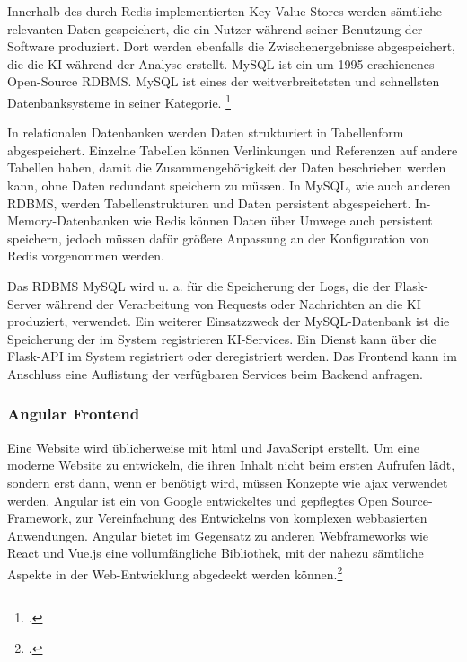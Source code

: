Innerhalb des durch Redis implementierten Key-Value-Stores werden sämtliche relevanten Daten gespeichert, die ein Nutzer während seiner Benutzung der Software produziert. Dort werden ebenfalls die Zwischenergebnisse abgespeichert, die die KI während der Analyse erstellt.
%
MySQL ist ein um 1995 erschienenes Open-Source RDBMS. MySQL ist eines der weitverbreitetsten und schnellsten Datenbanksysteme in seiner Kategorie. \footcite{dubois2008mysql}

In relationalen Datenbanken werden Daten strukturiert in Tabellenform abgespeichert. Einzelne Tabellen können Verlinkungen und Referenzen auf andere Tabellen haben, damit die Zusammengehörigkeit der Daten beschrieben werden kann, ohne Daten redundant speichern zu müssen. In MySQL, wie auch anderen RDBMS, werden Tabellenstrukturen und Daten persistent abgespeichert. In-Memory-Datenbanken wie Redis können Daten über Umwege auch persistent speichern, jedoch müssen dafür größere Anpassung an der Konfiguration von Redis vorgenommen werden.

Das RDBMS MySQL wird u. a. für die Speicherung der Logs, die der Flask-Server während der Verarbeitung von Requests oder Nachrichten an die KI produziert, verwendet. Ein weiterer Einsatzzweck der MySQL-Datenbank ist die Speicherung der im System registrieren KI-Services. Ein Dienst kann über die Flask-API im System registriert oder deregistriert werden. Das Frontend kann im Anschluss eine Auflistung der verfügbaren Services beim Backend anfragen.

\subsubsection{Angular Frontend}
Eine Website wird üblicherweise mit \ac{html} und JavaScript erstellt. Um eine moderne Website zu entwickeln, die ihren Inhalt nicht beim ersten Aufrufen lädt, sondern erst dann, wenn er benötigt wird, müssen Konzepte wie \ac{ajax} verwendet werden. Angular ist ein von Google entwickeltes und gepflegtes Open Source-Framework, zur Vereinfachung des Entwickelns von komplexen webbasierten Anwendungen. Angular bietet im Gegensatz zu anderen Webframeworks wie React und Vue.js eine vollumfängliche Bibliothek, mit der nahezu sämtliche Aspekte in der Web-Entwicklung abgedeckt werden können.\footcite{moiseev2018angular}


